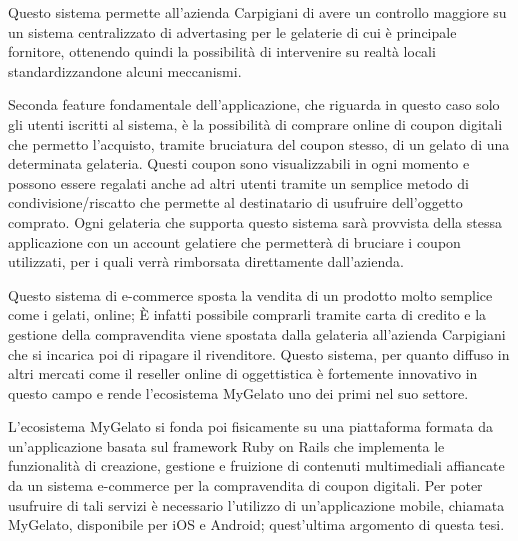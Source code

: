Questo sistema permette all'azienda Carpigiani di avere un controllo maggiore su un sistema centralizzato di advertasing per le gelaterie di cui è principale fornitore, ottenendo quindi la possibilità di intervenire su realtà locali standardizzandone alcuni meccanismi.

Seconda feature fondamentale dell'applicazione, che riguarda in questo caso solo gli utenti iscritti al sistema, è la possibilità di comprare online di coupon digitali che permetto l'acquisto, tramite bruciatura del coupon stesso, di un gelato di una determinata gelateria.
Questi coupon sono visualizzabili in ogni momento e possono essere regalati anche ad altri utenti tramite un semplice metodo di condivisione/riscatto che permette al destinatario di usufruire dell'oggetto comprato.
Ogni gelateria che supporta questo sistema sarà provvista della stessa applicazione con un account gelatiere che permetterà di bruciare i coupon utilizzati, per i quali verrà rimborsata direttamente dall'azienda.

Questo sistema di e-commerce sposta la vendita di un prodotto molto semplice come i gelati, online; È infatti possibile comprarli tramite carta di credito e la gestione della compravendita viene spostata dalla gelateria all'azienda Carpigiani che si incarica poi di ripagare il rivenditore.
Questo sistema, per quanto diffuso in altri mercati come il reseller online di oggettistica è fortemente innovativo in questo campo e rende l'ecosistema MyGelato uno dei primi nel suo settore.

L'ecosistema MyGelato si fonda poi fisicamente su una piattaforma formata da un’applicazione basata sul framework Ruby on Rails che implementa le funzionalità di creazione, gestione e fruizione di contenuti multimediali affiancate da un sistema e-commerce per la compravendita di coupon digitali.
Per poter usufruire di tali servizi è necessario l'utilizzo di un'applicazione mobile, chiamata MyGelato, disponibile per iOS e Android; quest'ultima argomento di questa tesi.

\newpage